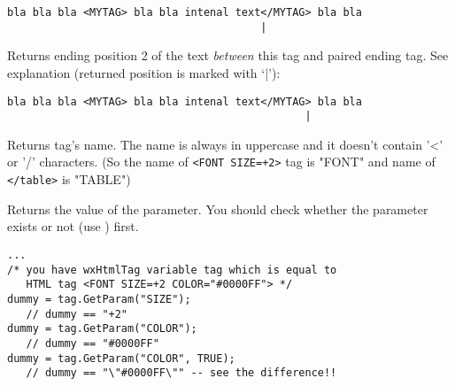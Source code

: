 \begin{verbatim}
bla bla bla <MYTAG> bla bla intenal text</MYTAG> bla bla
                                        |
\end{verbatim}


\label{wxhtmltaggetendpos2}


Returns ending position 2 of the text {\it between} this tag and paired
ending tag.
See explanation (returned position is marked with `|'):

\begin{verbatim}
bla bla bla <MYTAG> bla bla intenal text</MYTAG> bla bla
                                               |
\end{verbatim}

\label{wxhtmltaggetname}


Returns tag's name. The name is always in uppercase and it doesn't contain
'<' or '/' characters. (So the name of {\tt <FONT SIZE=+2>} tag is "FONT"
and name of {\tt </table>} is "TABLE")


\label{wxhtmltaggetparam}


Returns the value of the parameter. You should check whether the
parameter exists or not (use ) first.





\begin{verbatim}
...
/* you have wxHtmlTag variable tag which is equal to
   HTML tag <FONT SIZE=+2 COLOR="#0000FF"> */
dummy = tag.GetParam("SIZE");
   // dummy == "+2"
dummy = tag.GetParam("COLOR");
   // dummy == "#0000FF"
dummy = tag.GetParam("COLOR", TRUE);
   // dummy == "\"#0000FF\"" -- see the difference!!
\end{verbatim}

\label{wxhtmltaghasending}



